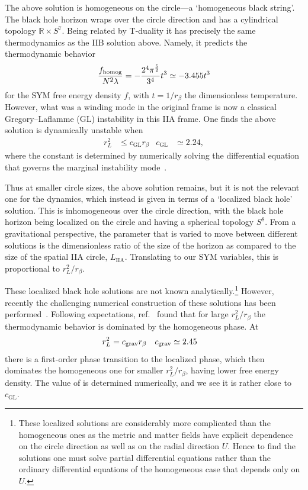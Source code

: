 The above solution is homogeneous on the circle---a `homogeneous black string'.
The black hole horizon wraps over the circle direction and has a cylindrical topology $\mathbb{R} \times S^7$.
Being related by T-duality it has precisely the same thermodynamics as the IIB solution above.
Namely, it predicts the thermodynamic behavior
\begin{equation}
  \label{eq:D1phase}
  \frac{f_{\text{homog}}}{N^2 \lambda} = -\frac{2^4 \pi^{\frac{5}{2}}}{3^4} t^3 \simeq -3.455 t^3
\end{equation}
for the SYM free energy density $f$, with $t = 1 / r_{\beta}$ the dimensionless temperature.
However, what was a winding mode in the original frame is now a classical Gregory--Laflamme (GL) instability in this IIA frame.
One finds the above solution is dynamically unstable when
\begin{align}
  r_L^2 & \le c_{\text{GL}} r_{\beta} &
  c_{\text{GL}} & \simeq 2.24,
\end{align}
where the constant is determined by numerically solving the differential equation that governs the marginal instability mode~\cite{Aharony:2004ig, Harmark:2004ws}.

Thus at smaller circle sizes, the above solution remains, but it is not the relevant one for the dynamics, which instead is given in terms of a `localized black hole' solution.
This is inhomogeneous over the circle direction, with the black hole horizon being localized on the circle and having a spherical topology $S^8$.
From a gravitational perspective, the parameter that is varied to move between different solutions is the dimensionless ratio of the size of the horizon as compared to the size of the spatial IIA circle, $L_{\text{IIA}}$.
Translating to our SYM variables, this is proportional to $r_L^2 / r_{\beta}$.

These localized black hole solutions are not known analytically.\footnote{These localized solutions are considerably more complicated than the homogeneous ones as the metric and matter fields have explicit dependence on the circle direction \xbar as well as on the radial direction $U$.  Hence to find the solutions one must solve partial differential equations rather than the ordinary differential equations of the homogeneous case that depends only on $U$.}
However, recently the challenging numerical construction of these solutions has been performed~\cite{Dias:2017uyv}.
Following expectations, ref.~\cite{Dias:2017uyv} found that for large $r_L^2 / r_{\beta}$ the thermodynamic behavior is dominated by the homogeneous phase.
At
\begin{align}
  \label{eq:cgrav}
  r_L^2 & = c_{\text{grav}} r_{\beta} &
  c_{\text{grav}} & \simeq 2.45
\end{align}
there is a first-order phase transition to the localized phase, which then dominates the homogeneous one for smaller $r_L^2 / r_{\beta}$, having lower free energy density.
The value of \cgrav is determined numerically, and we see it is rather close to $c_{\text{GL}}$.

